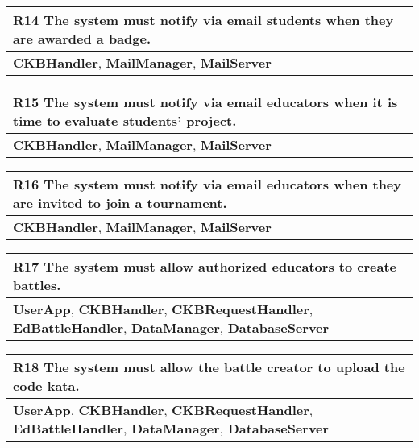 \begin{table}[H]
    \begin{tabularx}{\textwidth}{X}
        \toprule
        \textbf{R14} The system must notify via email students when they are awarded a badge. \\ \midrule
        \textbf{CKBHandler}, \textbf{MailManager}, \textbf{MailServer}              \\
    \end{tabularx}
\end{table}

\begin{table}[H]
    \begin{tabularx}{\textwidth}{X}
        \toprule
        \textbf{R15} The system must notify via email educators when it is time to evaluate students' project. \\ \midrule
        \textbf{CKBHandler}, \textbf{MailManager}, \textbf{MailServer}     
    \end{tabularx}
\end{table}

\begin{table}[H]
    \begin{tabularx}{\textwidth}{X}
        \toprule
        \textbf{R16} The system must notify via email educators when they are invited to join a tournament. \\ \midrule
        \textbf{CKBHandler}, \textbf{MailManager}, \textbf{MailServer} \\
    \end{tabularx}
\end{table}

\begin{table}[H]
    \begin{tabularx}{\textwidth}{X}
        \toprule
        \textbf{R17} The system must allow authorized educators to create battles. \\ \midrule
        \textbf{UserApp}, \textbf{CKBHandler}, \textbf{CKBRequestHandler}, \textbf{EdBattleHandler}, \textbf{DataManager}, \textbf{DatabaseServer}                   \\
    \end{tabularx}
\end{table}

\begin{table}[H]
    \begin{tabularx}{\textwidth}{X}
        \toprule
        \textbf{R18} The system must allow the battle creator to upload the code kata. \\ \midrule
        \textbf{UserApp}, \textbf{CKBHandler}, \textbf{CKBRequestHandler}, \textbf{EdBattleHandler}, \textbf{DataManager}, \textbf{DatabaseServer}                    \\
    \end{tabularx}
\end{table}

